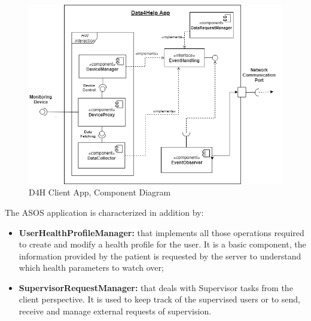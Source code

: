 \begin{flushleft}
{\begin{figure}[H]
	\centering
	\includegraphics[scale=0.6]{images/uml/D4H_client_component}
	\caption{D4H Client App, Component Diagram}
	\label{Figure 2}
\end{figure}
\newpage

{}
The ASOS application is characterized in addition by:
\begin{itemize}
	\item \textbf{UserHealthProfileManager:} that implements all those operations required to create and modify a health profile for the user. It is a basic component, the information provided by the patient is requested by the server to understand which health parameters to watch over;
	\item \textbf{SupervisorRequestManager:} that deals with Supervisor tasks from the client perspective. It is used to keep track of the supervised users or to send, receive and manage external requests of supervision.
\end{itemize}

}
\end{flushleft}
